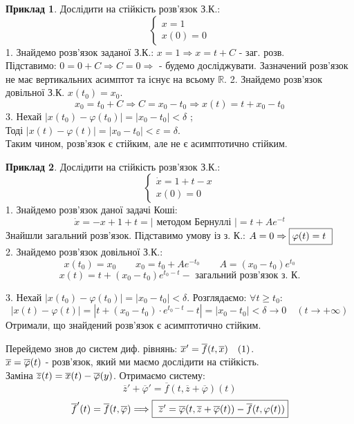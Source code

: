 \documentclass[14pt,a4paper]{scrartcl}
\theoremstyle{definition}
\newtheorem*{example}{Приклад}
\theoremstyle{remark}
\theoremstyle{definition}
\theoremstyle{definition}
\begin{document}
\begin{example}
    Дослідити на стійкість розв'язок З.К.:
$$
\begin{cases}
    x = 1 \\
    x(0) = 0
\end{cases}
$$
1. Знайдемо розв'язок заданої З.К.: $x = 1 \Rightarrow x = t + C$ - заг. розв.\\
Підставимо: $ 0 = 0 + C \Longrightarrow C = 0 \Longrightarrow $  - будемо досліджувати.
Зазначений розв'язок не має вертикальних асимптот та існує на всьому $\mathbb{R}$.
2. Знайдемо розв'язок довільної З.К. $x(t_0) = x_0$.
$$
x_0 = t_0 + C \Rightarrow C = x_0 - t_0 \Rightarrow x(t) = t + x_0 - t_0
$$
3. Нехай $  \left| x(t_0) - \varphi(t_0) \right|  =  \left| x_0 - t_0 \right| < \delta  $ ;\\
Тоді $ \left| x (t) - \varphi (t) \right|  = \left|  x_0 - t_0 \right| < \varepsilon = \delta $.\\
Таким чином, розв'язок є стійким, але не є асимптотично стійким.

\end{example}

\begin{example}
    Дослідити на стійкість розв'язок З.К.:
    $$
    \begin{cases}
        \dot{x} = 1 + t - x \\
        x(0) = 0
    \end{cases}
    $$
    1. Знайдемо розв'язок даної задачі Коші:
    $$
    \dot{x} = - x + 1 + t = \left| \text{ методом Бернуллі } \right| = t + Ae^{-t}
    $$
    Знайшли загальний розв'язок. Підставимо умову із з. К.: $ A = 0 \Rightarrow \fbox {$\varphi(t) = t$ }$\\
    2. Знайдемо розв'язок довільної З.К.:
    $$
    x(t_0) = x_0 \qquad x_0 = t_0 + Ae^{-t_0} \qquad A = (x_0 - t_0) e^{t_0}
    $$
    $$
    x(t) = t + (x_0 - t_0) e^{t_0 - t} - \text{ загальний розв'язок з. К.}
    $$

    3. Нехай $ \left|  x(t_0) - \varphi(t_0)  \right| = \left| x_0 - t_0 \right|  < \delta $. Розглядаємо: $ \forall t \geq t_0 :$
    $$
    \left| x(t) - \varphi(t) \right| = \left| t + (x_0 - t_0) \cdot e^{ t_0 - t} - t \right| =
     \left| x_0 - t_0 \right|< \delta  \to 0  \quad (t \to + \infty)
    $$
    Отримали, що знайдений розв'язок є асимптотично стійким.
\end{example}
Перейдемо знов до систем диф. рівнянь: $ \overline{x}' = \overline{f} (t, \overline{x})  \quad (1)$.\\
$\overline{x} = \overline{\varphi} (t)$ - розв'язок, який ми маємо дослідити на стійкість.\\
Заміна $ \overline{z} (t) = \overline{x} (t)  - \overline{\varphi} (y) $. Отримаємо систему:
$$ \overline{z}' + \overline{\varphi}'  = \overline{f} (t, \overline{z}+ \overline{\varphi})(t)$$
$$
\overline{f}' (t) = \overline{f} (t, \overline{\varphi})  \Longrightarrow \fbox{ $ \overline{z} ' = \overline{\varphi} (t, \overline{z} + \overline{\varphi} (t)) - \overline{f} ( t, \varphi(t)) $}
$$


\end{document}
